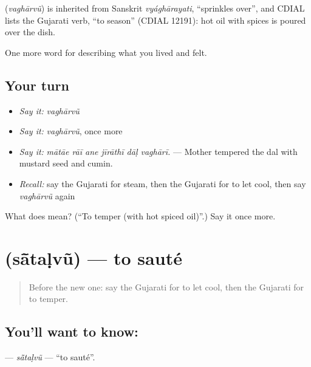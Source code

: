\begin{cousinweb}
\textbf{} (\emph{vaghārvũ}) is inherited from Sanskrit \emph{vyághārayati}, \textquotedblleft{}sprinkles over\textquotedblright{}, and CDIAL lists the Gujarati verb, \textquotedblleft{}to season\textquotedblright{} (CDIAL 12191): hot oil with spices is poured over the dish.
\end{cousinweb}

\begin{grammarlens}[title={What you've built}]
One more word for describing what you lived and felt.
\end{grammarlens}

\subsection*{Your turn}
\begin{itemize}
\raggedright
  \item \emph{Say it:} \emph{vaghārvũ}
  \item \emph{Say it:} \emph{vaghārvũ}, once more
  \item \emph{Say it:} \emph{mātāe rāī ane jīrāthī dāḷ vaghārī.} — Mother tempered the dal with mustard seed and cumin.
  \item \emph{Recall:} say the Gujarati for steam, then the Gujarati for to let cool, then say \emph{vaghārvũ} again
\end{itemize}

\begin{tcolorbox}[breakable,colback=teal!4,colframe=teal!35!black,title={Before you move on}]
What does  mean? (\textquotedblleft{}To temper (with hot spiced oil)\textquotedblright{}.) Say it once more.
\end{tcolorbox}
\section[\texorpdfstring{\gu{સાંતળવું} (sā̃taḷvũ)}{સાંતળવું (sā̃taḷvũ)}]{ (sā̃taḷvũ) — to sauté}

\label{lesson:GU-C520-satalvu}



\begin{quote}
Before the new one: say the Gujarati for to let cool, then the Gujarati for to temper.
\end{quote}

\subsection*{You'll want to know: }
\textbf{} — \emph{sā̃taḷvũ} — \textquotedblleft{}to sauté\textquotedblright{}.

